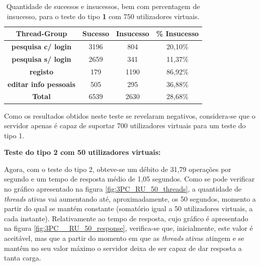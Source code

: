 \begin{table}[H]
\centering
\caption{Quantidade de sucessos e insucessos, bem com percentagem de insucesso, para o teste do tipo \textbf{1} com 750 utilizadores virtuais.}
\begin{tabular}{cccc}
\hline
\rowcolor[HTML]{EFEFEF} 
\textbf{Thread-Group}                  & \textbf{Sucesso} & \textbf{Insucesso} & \textbf{\% Insucesso} \\ \hline
\textbf{pesquisa c/ login}             & 3196             & 804                & 20,10\%               \\
\textbf{pesquisa s/ login}             & 2659             & 341                & 11,37\%               \\
\textbf{registo}                       & 179              & 1190               & 86,92\%               \\
\textbf{editar info pessoais}          & 505              & 295                & 36,88\%               \\ \hline
\cellcolor[HTML]{EFEFEF}\textbf{Total} & 6539             & 2630               & 28,68\%               \\ \hline
\end{tabular}
\end{table}

\vspace{0.5cm}
Como os resultados obtidos neste teste se revelaram negativos, considera-se que o servidor apenas é capaz de suportar 700 utilizadores virtuais para um teste do tipo 1.

\vspace{0.5cm}
\noindent\textbf{Teste do tipo 2 com 50 utilizadores virtuais:}

Agora, com o teste do tipo 2, obteve-se um débito de 31,79 operações por segundo e um tempo de resposta médio de 1,05 segundos. Como se pode verificar no gráfico apresentado na figura \ref{fig:3PC_RU_50_threads}, a quantidade de \textit{threads} ativas vai aumentando até, aproximadamente, os 50 segundos, momento a partir do qual se mantém constante (somatório igual a 50 utilizadores virtuais, a cada instante). Relativamente ao tempo de resposta, cujo gráfico é apresentado na figura \ref{fig:3PC__RU_50_response}, verifica-se que, inicialmente, este valor é aceitável, mas que a partir do momento em que as \textit{threads} ativas atingem e se mantêm no seu valor máximo o servidor deixa de ser capaz de dar resposta a tanta carga. 

